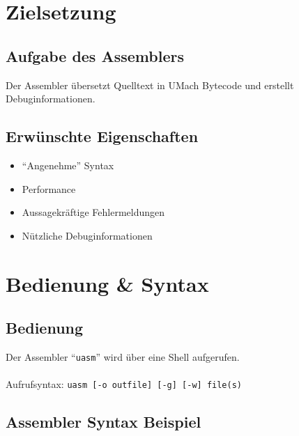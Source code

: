 
\section{Zielsetzung}

\subsection{Aufgabe des Assemblers}

\begin{frame}{\insertsubsection}
    Der Assembler übersetzt Quelltext in UMach Bytecode
    und erstellt Debuginformationen.
\end{frame}


\subsection{Erwünschte Eigenschaften}

\begin{frame}{\insertsubsection}
    \begin{itemize}
        \item ``Angenehme'' Syntax
        \item Performance
        \item Aussagekräftige Fehlermeldungen
        \item Nützliche Debuginformationen
    \end{itemize}
\end{frame}

\section{Bedienung \& Syntax}

\subsection{Bedienung}

\begin{frame}{\insertsubsection}
    Der Assembler ``\texttt{uasm}'' wird über eine Shell aufgerufen. \\~\\
    Aufrufsyntax: \texttt{uasm [-o outfile] [-g] [-w] file(s)}
\end{frame}

\subsection{Assembler Syntax Beispiel}

